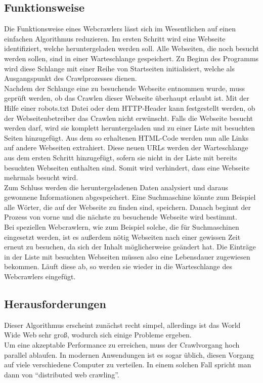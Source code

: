 \subsection{Funktionsweise}
Die Funktionsweise eines Webcrawlers lässt sich im Wesentlichen auf einen einfachen Algorithmus reduzieren. Im ersten Schritt wird eine Webseite identifiziert, welche heruntergeladen werden soll. Alle Webseiten, die noch besucht werden sollen, sind in einer Warteschlange gespeichert. Zu Beginn des Programms wird diese Schlange mit einer Reihe von Startseiten initialisiert, welche als Ausgangspunkt des Crawlprozesses dienen.\\
Nachdem der Schlange eine zu besuchende Webseite entnommen wurde, muss geprüft werden, ob das Crawlen dieser Webseite überhaupt erlaubt ist. Mit der Hilfe einer robots.txt Datei oder dem HTTP-Header kann festgestellt werden, ob der Webseitenbetreiber das Crawlen nicht erwünscht. Falls die Webseite besucht werden darf, wird sie komplett heruntergeladen und zu einer Liste mit besuchten Seiten hinzugefügt. Aus dem so erhaltenen HTML-Code werden nun alle Links auf andere Webseiten extrahiert. Diese neuen URLs werden der Warteschlange aus dem ersten Schritt hinzugefügt, sofern sie nicht in der Liste mit bereits besuchten Webseiten enthalten sind. Somit wird verhindert, dass eine Webseite mehrmals besucht wird. \\
Zum Schluss werden die heruntergeladenen Daten analysiert und daraus gewonnene Informationen abgespeichert. Eine Suchmaschine könnte zum Beispiel alle Wörter, die auf der Webseite zu finden sind, speichern. Danach beginnt der Prozess von vorne und die nächste zu besuchende Webseite wird bestimmt.\cite{WebCrawlerProcess} \\
Bei speziellen Webcrawlern, wie zum Beispiel solche, die für Suchmaschinen eingesetzt werden, ist es außerdem nötig Webseiten nach einer gewissen Zeit erneut zu besuchen, da sich der Inhalt möglicherweise geändert hat. Die Einträge in der Liste mit besuchten Webseiten müssen also eine Lebensdauer zugewiesen bekommen. Läuft diese ab, so werden sie wieder in die Warteschlange des Webcrawlers eingefügt.
\subsection{Herausforderungen}
Dieser Algorithmus erscheint zunächst recht simpel, allerdings ist das World Wide Web sehr groß, wodurch sich einige Probleme ergeben. \cite{WebCrawlerChallenges}\\ 
Um eine akzeptable Performance zu erreichen, muss der Crawlvorgang hoch parallel ablaufen. In modernen Anwendungen ist es sogar üblich, diesen Vorgang auf viele verschiedene Computer zu verteilen. In einem solchen Fall spricht man dann von \enquote{distributed web crawling}. 

